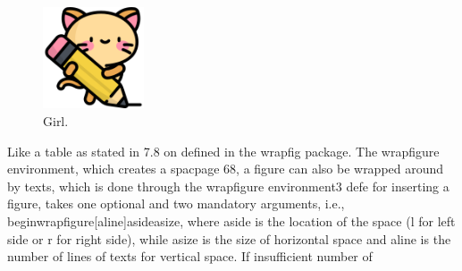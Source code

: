 \documentclass[12pt]{article}
\begin{document}
\begin{figure} %
    \includegraphics[width=3.0cm]{kitty.png}
    \caption{Girl.}
    \label{girl}
    \end{figure}
    Like a table as stated in 7.8 on defined in the
wrapfig package. The wrapfigure environment, which creates a spacpage 68, a figure can also be wrapped around
by texts, which is done through the wrapfigure environment3 defe for
inserting a figure, takes one optional and two mandatory arguments, i.e.,
begin{wrapfigure}[aline]{aside}{asize}, where aside is the location of the space
(l for left side or r for right side), while asize is the size of horizontal space and
aline is the number of lines of texts for vertical space. If insufficient number of
\end{document}
